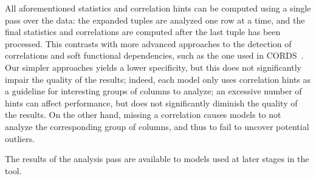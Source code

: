 All aforementioned statistics and correlation hints can be computed using a single pass over the data: the expanded tuples are analyzed one row at a time, and the final statistics and correlations are computed after the last tuple has been processed. This contrasts with more advanced approaches to the detection of correlations and soft functional dependencies, such as the one used in CORDS~\cite{Ilyas2004}. Our simpler approaches yields a lower specificity, but this does not significantly impair the quality of the results; indeed, each model only uses correlation hints as a guideline for interesting groups of columns to analyze; an excessive number of hints can affect performance, but does not significantly diminish the quality of the results. On the other hand, missing a correlation causes models to not analyze the corresponding group of columns, and thus to fail to uncover potential outliers.

The results of the analysis pass are available to models used at later stages in the tool.
